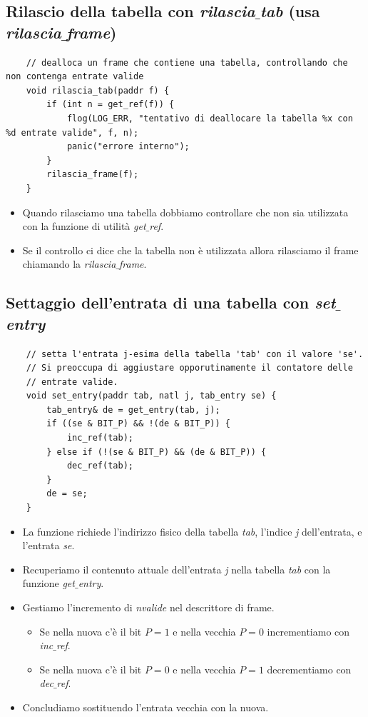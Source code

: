 \subsection{Rilascio della tabella con \emph{rilascia$\_$tab} (usa \emph{rilascia$\_$frame})}
\small 
\begin{verbatim}
	// dealloca un frame che contiene una tabella, controllando che non contenga entrate valide
	void rilascia_tab(paddr f) {
		if (int n = get_ref(f)) {
			flog(LOG_ERR, "tentativo di deallocare la tabella %x con %d entrate valide", f, n);
			panic("errore interno");
		}
		rilascia_frame(f);
	}
\end{verbatim}
\normalsize 
\begin{itemize}
	\item Quando rilasciamo una tabella dobbiamo controllare che non sia utilizzata con la funzione di utilità \emph{get$\_$ref}.
	\item Se il controllo ci dice che la tabella non è utilizzata allora rilasciamo il frame chiamando la \emph{rilascia$\_$frame}.
\end{itemize}

\subsection{Settaggio dell'entrata di una tabella con \emph{set$\_$entry}}
\small 
\begin{verbatim}
	// setta l'entrata j-esima della tabella 'tab' con il valore 'se'.
	// Si preoccupa di aggiustare opporutinamente il contatore delle
	// entrate valide.
	void set_entry(paddr tab, natl j, tab_entry se) {
		tab_entry& de = get_entry(tab, j);
		if ((se & BIT_P) && !(de & BIT_P)) {
			inc_ref(tab);
		} else if (!(se & BIT_P) && (de & BIT_P)) {
			dec_ref(tab);
		}
		de = se;
	}
\end{verbatim}
\normalsize
\begin{itemize}
	\item La funzione richiede l'indirizzo fisico della tabella \emph{tab}, l'indice \emph{j} dell'entrata, e l'entrata \emph{se}.
	\item Recuperiamo il contenuto attuale dell'entrata \emph{j} nella tabella \emph{tab} con la funzione \emph{get$\_$entry}.
	\item Gestiamo l'incremento di \emph{nvalide} nel descrittore di frame.
	\begin{itemize}
		\item Se nella nuova c'è il bit $P=1$ e nella vecchia $P=0$ incrementiamo con \emph{inc$\_$ref}.
		\item Se nella nuova c'è il bit $P=0$ e nella vecchia $P=1$ decrementiamo con \emph{dec$\_$ref}.
	\end{itemize}
	\item Concludiamo sostituendo l'entrata vecchia con la nuova.
\end{itemize}
